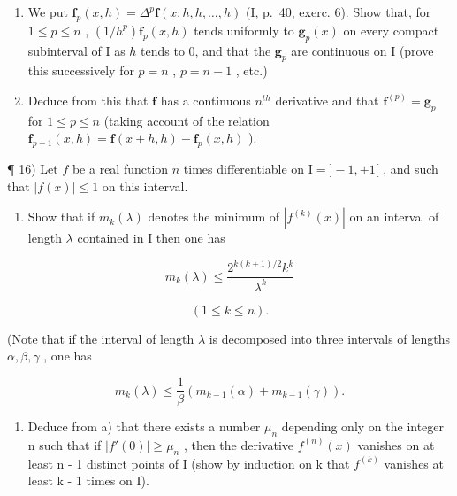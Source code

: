 \begin{enumerate}
\def\labelenumi{\alph{enumi})}
\item
  We put \(\mathbf{f}_p(x,h) = \Delta^p\mathbf{f}(x;h,h,\ldots ,h)\) (I, p.~40, exerc. 6). Show that, for \(1\leqslant p\leqslant n\) , \((1 / h^{p})\mathbf{f}_{p}(x,h)\) tends uniformly to \(\mathbf{g}_p(x)\) on every compact subinterval of I as \(h\) tends to 0, and that the \(\mathbf{g}_p\) are continuous on I (prove this successively for \(p = n\) , \(p = n - 1\) , etc.)
\item
  Deduce from this that \(\mathbf{f}\) has a continuous \(n^{th}\) derivative and that \(\mathbf{f}^{(p)} = \mathbf{g}_p\) for \(1 \leqslant p \leqslant n\) (taking account of the relation \(\mathbf{f}_{p+1}(x, h) = \mathbf{f}(x + h, h) - \mathbf{f}_p(x, h)\) ).
\end{enumerate}

¶ 16) Let \(f\) be a real function \(n\) times differentiable on \(\mathrm{I} = ] - 1, + 1[\) , and such that \(|f(x)|\leqslant 1\) on this interval.

\begin{enumerate}
\def\labelenumi{\alph{enumi})}
\tightlist
\item
  Show that if \(m_k(\lambda)\) denotes the minimum of \(|f^{(k)}(x)|\) on an interval of length \(\lambda\) contained in I then one has
\end{enumerate}

\[
m _ {k} (\lambda) \leqslant \frac {2 ^ {k (k + 1) / 2} k ^ {k}}{\lambda^ {k}}
\]

\[
(1 \leqslant k \leqslant n).
\]

(Note that if the interval of length \(\lambda\) is decomposed into three intervals of lengths \(\alpha, \beta, \gamma\) , one has

\[
m _ {k} (\lambda) \leqslant \frac {1}{\beta} (m _ {k - 1} (\alpha) + m _ {k - 1} (\gamma)).
\]

\begin{enumerate}
\def\labelenumi{\alph{enumi})}
\setcounter{enumi}{1}
\tightlist
\item
  Deduce from a) that there exists a number \(\mu_{n}\) depending only on the integer n such that if \(|f'(0)| \geqslant \mu_{n}\) , then the derivative \(f^{(n)}(x)\) vanishes on at least n - 1 distinct points of I (show by induction on k that \(f^{(k)}\) vanishes at least k - 1 times on I).
\end{enumerate}

